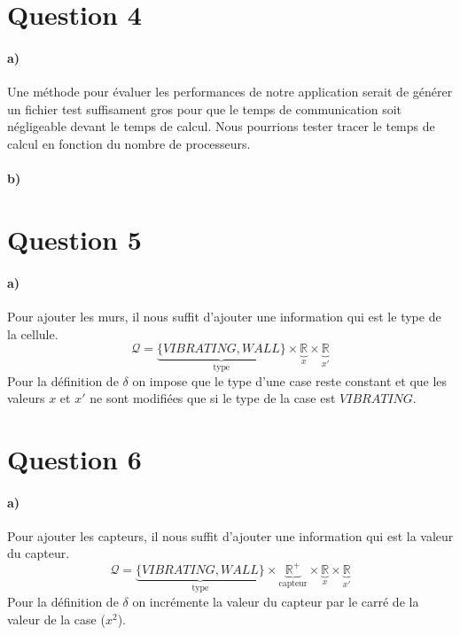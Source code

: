 \documentclass[a4paper]{article}
\begin{document}
  \section*{Question 4}
  
  \paragraph{a)} Une méthode pour évaluer les performances de notre application serait de générer un fichier test suffisament gros pour que le temps de communication soit négligeable devant le temps de calcul. Nous pourrions tester tracer le temps de calcul en fonction du nombre de processeurs.
  
  
  \paragraph{b)}
  
  \section*{Question 5}
  
  \paragraph{a)} Pour ajouter les murs, il nous suffit d'ajouter une information qui est le type de la cellule.
  \[\mathcal Q = \underbrace{\{VIBRATING, WALL\}}_{\text{type}} \times \underbrace{\mathbb R}_{x} \times  \underbrace{\mathbb R}_{x'}\]
  Pour la définition de $\delta$ on impose que le type d'une case reste constant et que les valeurs $x$ et $x'$ ne sont modifiées que si le type de la case est $VIBRATING$.
  
  \section*{Question 6}
  
  \paragraph{a)} Pour ajouter les capteurs, il nous suffit d'ajouter une information qui est la valeur du capteur.
  \[\mathcal Q = \underbrace{\{VIBRATING, WALL\}}_{\text{type}} \times \underbrace{\mathbb R^+}_{\text{capteur}}\times \underbrace{\mathbb R}_{x} \times  \underbrace{\mathbb R}_{x'}\] Pour la définition de $\delta$ on incrémente la valeur du capteur par le carré de la valeur de la case ($x^2$).
  
\end{document}
